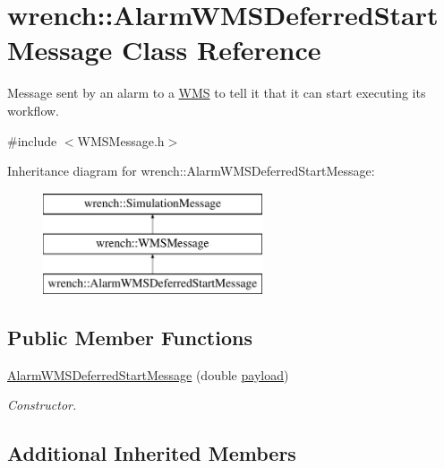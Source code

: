 \hypertarget{classwrench_1_1_alarm_w_m_s_deferred_start_message}{}\section{wrench\+:\+:Alarm\+W\+M\+S\+Deferred\+Start\+Message Class Reference}
\label{classwrench_1_1_alarm_w_m_s_deferred_start_message}


Message sent by an alarm to a \hyperlink{classwrench_1_1_w_m_s}{W\+MS} to tell it that it can start executing its workflow.  




{\ttfamily \#include $<$W\+M\+S\+Message.\+h$>$}

Inheritance diagram for wrench\+:\+:Alarm\+W\+M\+S\+Deferred\+Start\+Message\+:\begin{figure}[H]
\begin{center}
\leavevmode
\includegraphics[height=3.000000cm]{classwrench_1_1_alarm_w_m_s_deferred_start_message}
\end{center}
\end{figure}
\subsection*{Public Member Functions}
\begin{DoxyCompactItemize}
\item 
\hyperlink{classwrench_1_1_alarm_w_m_s_deferred_start_message_ade99acf79252141cb305cebc8f334d42}{Alarm\+W\+M\+S\+Deferred\+Start\+Message} (double \hyperlink{classwrench_1_1_simulation_message_a914f2732713f7c02898e66f05a7cb8a1}{payload})
\begin{DoxyCompactList}\small\item\em Constructor. \end{DoxyCompactList}\end{DoxyCompactItemize}
\subsection*{Additional Inherited Members}


